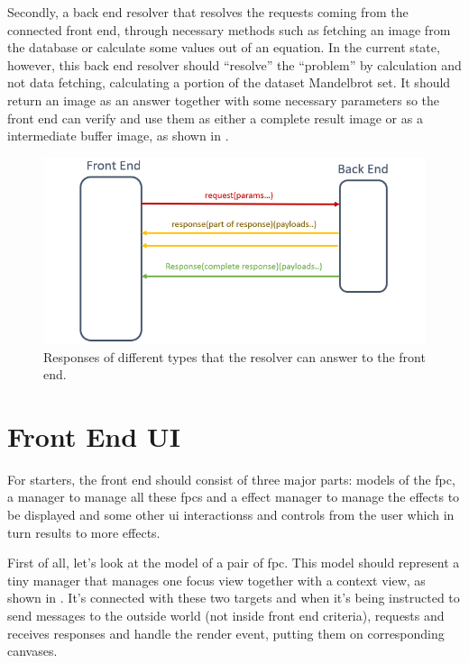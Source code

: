 Secondly, a back end resolver that resolves the requests coming from the connected front end, through necessary methods such as fetching an image from the database or calculate some values out of an equation. In the current state, however, this back end resolver should ``resolve'' the ``problem'' by calculation and not data fetching, calculating a portion of the dataset Mandelbrot set. It should return an image as an answer together with some necessary parameters so the front end can verify and use them as either a complete result image or as a intermediate buffer image, as shown in .

\begin{figure}[th]
\centering
\includegraphics[width=.9\textwidth,keepaspectratio]{Figures/Chapter3/responsetypes.png}
\decoRule
\caption[Different Reponse Types]{Responses of different types that the resolver can answer to the front end.}
\label{fig:responsetypes}
\end{figure}


\section{Front End UI}

For starters, the front end should consist of three major parts: models of the \gls{fpc}, a manager to manage all these \glspl{fpc} and a effect manager to manage the effects to be displayed and some other \gls{ui} interactionss and controls from the user which in turn results to more effects.

First of all, let's look at the model of a pair of \gls{fpc}. This model should represent a tiny manager that manages one focus view together with a context view, as shown in . It's connected with these two targets and when it's being instructed to send messages to the outside world (not inside front end criteria), requests and receives responses and handle the render event, putting them on corresponding canvases.

